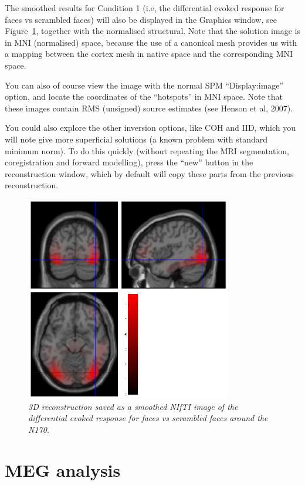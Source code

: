 The smoothed results for Condition 1 (i.e, the differential evoked response for faces vs scrambled faces) will also be displayed in the Graphics window, see Figure~\ref{multimodal:fig:eegrecon}, together with the normalised structural. Note that the solution image is in MNI (normalised) space, because the use of a canonical mesh provides us with a mapping between the cortex mesh in native space and the corresponding MNI space.

You can also of course view the image with the normal SPM ``Display:image'' option, and locate the coordinates of the ``hotspots'' in MNI space. Note that these images contain RMS (unsigned) source estimates (see Henson et al, 2007).

You could also explore the other inversion options, like COH and IID, which you will note give more superficial solutions (a known problem with standard minimum norm). To do this quickly (without repeating the MRI segmentation, coregistration and forward modelling), press the ``new'' button in the reconstruction window, which by default will copy these parts from the previous reconstruction.

\begin{figure}[h!t]
\begin{center}
\includegraphics[width=90mm]{multimodal/figures/eeg_recon.png}
\caption{\em 3D reconstruction saved as a smoothed NIfTI image of the differential evoked response for faces vs scrambled faces around the N170. \label{multimodal:fig:eegrecon}}
\end{center}
\end{figure}

\section{MEG analysis}

